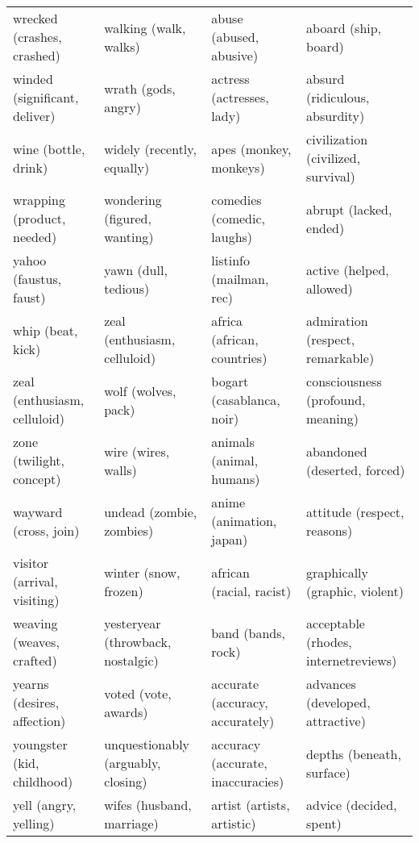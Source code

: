 \begin{landscape}
\begin{table}[]
\begin{tabular}{llll}
		wrecked (crashes, crashed)     & walking (walk, walks)              & abuse (abused, abusive)               & aboard (ship, board)                 \\
		winded (significant, deliver)  & wrath (gods, angry)                & actress (actresses, lady)             & absurd (ridiculous, absurdity)       \\
		wine (bottle, drink)           & widely (recently, equally)         & apes (monkey, monkeys)                & civilization (civilized, survival)   \\
		wrapping (product, needed)     & wondering (figured, wanting)       & comedies (comedic, laughs)            & abrupt (lacked, ended)               \\
		yahoo (faustus, faust)         & yawn (dull, tedious)               & listinfo (mailman, rec)               & active (helped, allowed)             \\
		whip (beat, kick)              & zeal (enthusiasm, celluloid)       & africa (african, countries)           & admiration (respect, remarkable)     \\
		zeal (enthusiasm, celluloid)   & wolf (wolves, pack)                & bogart (casablanca, noir)             & consciousness (profound, meaning)    \\
		zone (twilight, concept)       & wire (wires, walls)                & animals (animal, humans)              & abandoned (deserted, forced)         \\
		wayward (cross, join)          & undead (zombie, zombies)           & anime (animation, japan)              & attitude (respect, reasons)          \\
		visitor (arrival, visiting)    & winter (snow, frozen)              & african (racial, racist)              & graphically (graphic, violent)       \\
		weaving (weaves, crafted)      & yesteryear (throwback, nostalgic)  & band (bands, rock)                    & acceptable (rhodes, internetreviews) \\
		yearns (desires, affection)    & voted (vote, awards)               & accurate (accuracy, accurately)       & advances (developed, attractive)     \\
		youngster (kid, childhood)     & unquestionably (arguably, closing) & accuracy (accurate, inaccuracies)     & depths (beneath, surface)            \\
		yell (angry, yelling)          & wifes (husband, marriage)          & artist (artists, artistic)            & advice (decided, spent)              \\

\end{tabular}
\end{table}
\end{landscape}
